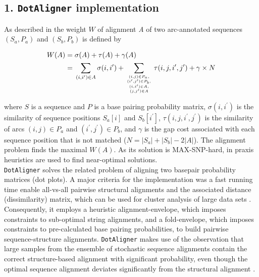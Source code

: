 \documentclass{bmcart}
\newcommand\dotaligner{\texttt{DotAligner}}
\begin{document}
\subsection*{ 1. \dotaligner{} implementation }
\noindent As described in \cite{Palu2010} the weight $W$ of alignment \emph{A}
of two arc-annotated sequences $(S_a,P_a)$ and $(S_b,P_b)$ is defined by

\begin{equation}\label{eq1}
\begin{aligned}
	W(A) ={} & \sigma(A) + \tau(A) + \gamma(A) \\
	     ={} & \sum_{(i,i^\prime) \in A} \sigma(i,i^\prime) + \sum_{(i,j) \in
	P_a,\atop {(i^\prime,j^\prime) \in P_b,\atop {(i,i^\prime) \in
	A,\atop (j,j^\prime) \in A}}} \tau(i,j,i^\prime,j^\prime) + \gamma
	\times N
\end{aligned}
\end{equation}

\noindent where $S$ is a sequence and $P$ is a base pairing probability matrix,
$\sigma(i,i^\prime)$ is the similarity of sequence positions $S_a[i]$ and
$S_b[i^\prime]$, $\tau(i,j,i^\prime,j^\prime)$ is the similarity of arcs $(i,j)
\in P_a$ and $(i^\prime,j^\prime) \in P_b$,
and $\gamma$ is the gap cost associated with each sequence position that is not
matched ($N = |S_a|+|S_b|-2|A|$). The alignment problem finds the maximal
$W(A)$. As its solution is MAX-SNP-hard, in praxis heuristics are used to find
near-optimal solutions.\\

\dotaligner{} solves the related problem of aligning two basepair
probability matrices (dot plots). A major criteria for the implementation was a fast
running time enable all-vs-all pairwise structural alignments and the 
associated distance (dissimilarity) matrix, which can be used for 
cluster analysis of large data sets \cite{Will17432929}. Consequently, 
it employs a heuristic alignment-envelope, 
which imposes constraints to sub-optimal string alignments, 
and a fold-envelope, which imposes constraints to pre-calculated base pairing probabilities, 
to build pairwise sequence-structure alignments. 
\dotaligner{} makes use of the observation that large samples from the ensemble 
of stochastic sequence alignments contain the correct structure-based alignment
with significant probability,  even though the optimal
sequence alignment deviates significantly from the structural alignment
\cite{muckstein2002stochastic}. \\
\end{document}
